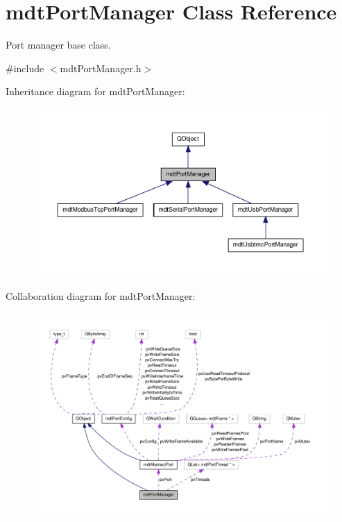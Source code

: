 \hypertarget{classmdt_port_manager}{\section{mdt\-Port\-Manager Class Reference}
\label{classmdt_port_manager}
}


Port manager base class.  




{\ttfamily \#include $<$mdt\-Port\-Manager.\-h$>$}



Inheritance diagram for mdt\-Port\-Manager\-:
\nopagebreak
\begin{figure}[H]
\begin{center}
\leavevmode
\includegraphics[width=350pt]{classmdt_port_manager__inherit__graph}
\end{center}
\end{figure}


Collaboration diagram for mdt\-Port\-Manager\-:
\nopagebreak
\begin{figure}[H]
\begin{center}
\leavevmode
\includegraphics[width=350pt]{classmdt_port_manager__coll__graph}
\end{center}
\end{figure}
